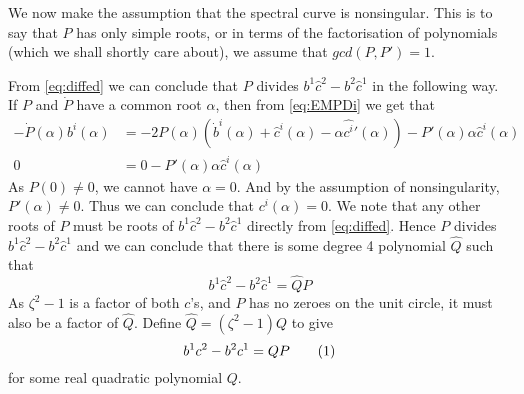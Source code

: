 \documentclass{article}
\newcommand{\labelthis}[1]{\addtocounter{equation}{1}\tag{\theequation}\label{#1}}
\begin{document}
We now make the assumption that the spectral curve is nonsingular. This is to say that $P$ has only simple roots, or in terms of the factorisation of polynomials (which we shall shortly care about), we assume that $gcd(P,P') = 1$.

From \eqref{eq:diffed} we can conclude that $P$ divides $b^1\hat c^2 - b^2\hat c^1$ in the following way. If $P$ and $\dot P$ have a common root $\alpha$, then from \eqref{eq:EMPDi} we get that
\begin{align*}
-\dot P(\alpha) b^i(\alpha) &= -2P(\alpha)\left( \dot b^i(\alpha) + \hat c^i(\alpha) - \alpha\hat {c^i}'(\alpha)\right) -P'(\alpha)\alpha\hat c^i(\alpha) \\
0 &= 0 - P'(\alpha)\alpha\hat c^i(\alpha)
\end{align*}
As $P(0)\neq 0$, we cannot have $\alpha=0$. And by the assumption of nonsingularity, $P'(\alpha)\neq 0$. Thus we can conclude that $c^i(\alpha)=0$. We note that any other roots of $P$ must be roots of $b^1\hat c^2 - b^2 \hat c^1$ directly from \eqref{eq:diffed}. Hence $P$ divides $b^1\hat c^2 - b^2 \hat c^1$ and we can conclude that there is some degree 4 polynomial $\hat Q$ such that
\[
b^1 \hat c^2 - b^2 \hat c^1 = \hat Q P
\]
As $\zeta^2-1$ is a factor of both $c$'s, and $P$ has no zeroes on the unit circle, it must also be a factor of $\hat Q$. Define $\hat Q = (\zeta^2-1)Q$ to give
\[
b^1 c^2 - b^2 c^1 = Q P \labelthis{eq:Q}
\]
for some real quadratic polynomial $Q$.
\end{document}
